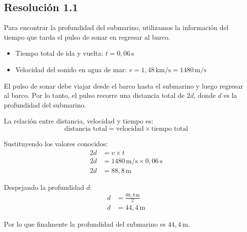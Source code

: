 \documentclass[
  11pt,
  letterpaper,
   addpoints,
   answers
  ]{exam}
\begin{document}
\begin{questions}
\begin{solution}
\subsection*{Resolución 1.1 }

Para encontrar la profundidad del submarino, utilizamos la información del tiempo que tarda el pulso de sonar en regresar al barco.

\begin{itemize}
    \item Tiempo total de ida y vuelta: $t = 0{,}06\,\mathrm{s}$
    \item Velocidad del sonido en agua de mar: $v = 1{,}48\,\mathrm{km/s} = 1480\,\mathrm{m/s}$
\end{itemize}


El pulso de sonar debe viajar desde el barco hasta el submarino y luego regresar al barco. Por lo tanto, el pulso recorre una distancia total de $2d$, donde $d$ es la profundidad del submarino.

La relación entre distancia, velocidad y tiempo es:
\begin{equation}
\text{distancia total} = \text{velocidad} \times \text{tiempo total}
\end{equation}

Sustituyendo los valores conocidos:
\begin{align}
2d &= v \times t \\
2d &= 1480\,\mathrm{m/s} \times 0{,}06\,\mathrm{s} \\
2d &= 88{,}8\,\mathrm{m}
\end{align}

Despejando la profundidad $d$:
\begin{align}
d &= \frac{88{,}8\,\mathrm{m}}{2} \\
d &= 44{,}4\,\mathrm{m}
\end{align}

Por lo que finalmente la profundidad del submarino es $\boxed{44{,}4\,\mathrm{m}}$.


\end{solution}
\end{questions}
\end{document}

